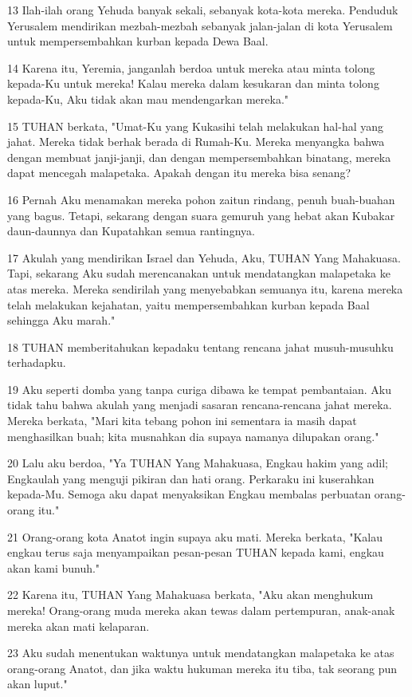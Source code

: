 \par 13 Ilah-ilah orang Yehuda banyak sekali, sebanyak kota-kota mereka. Penduduk Yerusalem mendirikan mezbah-mezbah sebanyak jalan-jalan di kota Yerusalem untuk mempersembahkan kurban kepada Dewa Baal.
\par 14 Karena itu, Yeremia, janganlah berdoa untuk mereka atau minta tolong kepada-Ku untuk mereka! Kalau mereka dalam kesukaran dan minta tolong kepada-Ku, Aku tidak akan mau mendengarkan mereka."
\par 15 TUHAN berkata, "Umat-Ku yang Kukasihi telah melakukan hal-hal yang jahat. Mereka tidak berhak berada di Rumah-Ku. Mereka menyangka bahwa dengan membuat janji-janji, dan dengan mempersembahkan binatang, mereka dapat mencegah malapetaka. Apakah dengan itu mereka bisa senang?
\par 16 Pernah Aku menamakan mereka pohon zaitun rindang, penuh buah-buahan yang bagus. Tetapi, sekarang dengan suara gemuruh yang hebat akan Kubakar daun-daunnya dan Kupatahkan semua rantingnya.
\par 17 Akulah yang mendirikan Israel dan Yehuda, Aku, TUHAN Yang Mahakuasa. Tapi, sekarang Aku sudah merencanakan untuk mendatangkan malapetaka ke atas mereka. Mereka sendirilah yang menyebabkan semuanya itu, karena mereka telah melakukan kejahatan, yaitu mempersembahkan kurban kepada Baal sehingga Aku marah."
\par 18 TUHAN memberitahukan kepadaku tentang rencana jahat musuh-musuhku terhadapku.
\par 19 Aku seperti domba yang tanpa curiga dibawa ke tempat pembantaian. Aku tidak tahu bahwa akulah yang menjadi sasaran rencana-rencana jahat mereka. Mereka berkata, "Mari kita tebang pohon ini sementara ia masih dapat menghasilkan buah; kita musnahkan dia supaya namanya dilupakan orang."
\par 20 Lalu aku berdoa, "Ya TUHAN Yang Mahakuasa, Engkau hakim yang adil; Engkaulah yang menguji pikiran dan hati orang. Perkaraku ini kuserahkan kepada-Mu. Semoga aku dapat menyaksikan Engkau membalas perbuatan orang-orang itu."
\par 21 Orang-orang kota Anatot ingin supaya aku mati. Mereka berkata, "Kalau engkau terus saja menyampaikan pesan-pesan TUHAN kepada kami, engkau akan kami bunuh."
\par 22 Karena itu, TUHAN Yang Mahakuasa berkata, "Aku akan menghukum mereka! Orang-orang muda mereka akan tewas dalam pertempuran, anak-anak mereka akan mati kelaparan.
\par 23 Aku sudah menentukan waktunya untuk mendatangkan malapetaka ke atas orang-orang Anatot, dan jika waktu hukuman mereka itu tiba, tak seorang pun akan luput."

